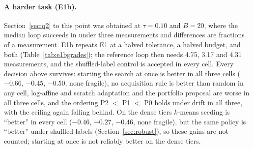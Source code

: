 \documentclass[11pt,a4paper]{article}
\begin{document}
\paragraph{A harder task (E1b).} Section~\ref{sec:q2} to this point was obtained at $\tau = 0.10$ and
$B = 20$, where the median loop succeeds in under three measurements and differences are fractions of
a measurement. E1b repeats E1 at a halved tolerance, a halved budget, and both
(Table~\ref{tab:e1bgrades}); the reference loop then needs 4.75, 3.17 and
4.31 measurements, and the shuffled-label control is accepted in every cell. Every
decision above survives: starting the search at once is better in all three cells
($-0.66$, $-0.45$, $-0.50$, none fragile), no acquisition rule
is better than random in any cell, log-affine and scratch adaptation and the portfolio
proposal are worse in all three cells, and the ordering P2 $<$ P1 $<$ P0 holds under drift in all
three, with the ceiling again falling behind. On the dense tiers $k$-means seeding is ``better'' in
every cell ($-0.46$, $-0.27$, $-0.46$, none fragile), but the same policy is ``better'' under
shuffled labels (Section~\ref{sec:robust}), so these gains are not counted; starting at once is not
reliably better on the dense tiers.
\end{document}
